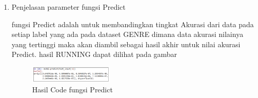 \begin{enumerate}
            \item Penjelasan parameter fungsi Predict
            
            
            
            \subitem fungsi Predict adalah untuk membandingkan tingkat Akurasi dari data pada setiap label yang ada pada dataset GENRE dimana data akurasi nilainya yang tertinggi maka akan diambil sebagai hasil akhir untuk nilai akurasi Predict. hasil RUNNING dapat dilihat pada gambar
            
            \begin{figure}[H]
                \includegraphics[width=4cm]{figures/1174009/chapter6/12.png}
                \centering
                  \caption{Hasil Code fungsi Predict}
            \end{figure}
            \end{enumerate}